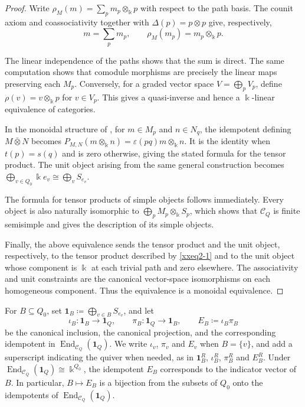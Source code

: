 \documentclass{amsart}
\newcommand{\btensor}{\mathbin{\bar{\otimes}}}
\theoremstyle{definition}
\theoremstyle{remark}
\numberwithin{equation}{section}
\begin{document}
\begin{proof}
Write $\rho_M(m)=\sum_p m_p\otimes_{\Bbbk} p$
with respect to the path basis.
The counit axiom and coassociativity together with
$\Delta(p)=p\otimes p$ give, respectively,
\[
m=\sum_p m_p,
\qquad
\rho_M(m_p)=m_p\otimes_{\Bbbk} p.
\]

The linear independence of the paths shows that the sum is direct.
The same computation shows that comodule morphisms are precisely the
linear maps preserving each $M_p$. Conversely, for a graded vector space
$V=\bigoplus_pV_p$, define
$\rho(v)=v\otimes_{\Bbbk} p$ for $v\in V_p$.
This gives a quasi-inverse and hence a $\Bbbk$-linear equivalence of categories.

In the monoidal structure of
\cite[Section~3]{bohm2011weak}, for $m\in M_p$ and
$n\in N_q$, the idempotent defining $M\btensor N$ becomes
$P_{M,N}(m\otimes_{\Bbbk} n)=\varepsilon(pq)m\otimes_{\Bbbk} n$.
It is the identity when $t(p)=s(q)$ and is zero otherwise, giving the stated formula for the tensor product.
The unit object arising from the same general construction becomes
$\bigoplus_{v\in Q_0}\Bbbk e_v\cong\bigoplus_vS_{e_v}$.

The formula for tensor products of simple objects follows immediately.
Every object is also naturally isomorphic to
$\bigoplus_pM_p\otimes_{\Bbbk}S_p$,
which shows that $\mathcal C_Q$ is finite semisimple and gives the
description of its simple objects.

Finally, the above equivalence sends the tensor product and the unit object,
respectively, to the tensor product described by
\eqref{xxeq2-1}
and to the unit object whose component is $\Bbbk$ at each trivial path and zero
elsewhere.
The associativity and unit constraints are the canonical vector-space isomorphisms on each homogeneous component.
Thus the equivalence is a monoidal equivalence.
\end{proof}

For $B\subseteq Q_0$, set
$\mathbf1_B\coloneqq\bigoplus_{v\in B}S_{e_v}$, and let
\[
\iota_B\colon\mathbf1_B\longrightarrow\mathbf1_Q,
\qquad
\pi_B\colon\mathbf1_Q\longrightarrow\mathbf1_B,
\qquad
E_B\coloneqq\iota_B\pi_B
\]
be the canonical inclusion, the canonical projection, and the corresponding
idempotent in $\operatorname{End}_{\mathcal C_Q}(\mathbf1_Q)$.
We write $\iota_v$, $\pi_v$ and $E_v$ when $B=\{v\}$, and add a superscript
indicating the quiver when needed, as in $\mathbf1_B^R$, $\iota_B^R$,
$\pi_B^R$ and $E_B^R$.
Under
$\operatorname{End}_{\mathcal C_Q}(\mathbf1_Q)\cong \Bbbk^{Q_0}$, the idempotent
$E_B$ corresponds to the indicator vector of $B$. In particular,
$B\mapsto E_B$ is a bijection from the subsets of $Q_0$ onto the idempotents
of $\operatorname{End}_{\mathcal C_Q}(\mathbf1_Q)$.
\end{document}
